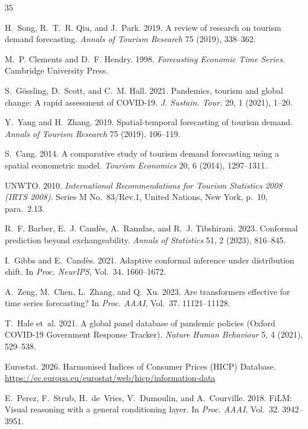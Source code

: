 \documentclass[sigconf]{acmart}
\begin{document}
\begingroup
\renewcommand{\bibfont}{\scriptsize}
\setlength{\bibsep}{0pt}
\begin{thebibliography}{35}

H.~Song, R.~T.~R. Qiu, and J.~Park. 2019. A review of research on tourism demand forecasting. \emph{Annals of Tourism Research} 75 (2019), 338--362.

M.~P. Clements and D.~F. Hendry. 1998. \emph{Forecasting Economic Time Series}. Cambridge University Press.

S.~G{\"o}ssling, D.~Scott, and C.~M. Hall. 2021. Pandemics, tourism and global change: A rapid assessment of COVID-19. \emph{J. Sustain. Tour.} 29, 1 (2021), 1--20.

Y.~Yang and H.~Zhang. 2019. Spatial-temporal forecasting of tourism demand. \emph{Annals of Tourism Research} 75 (2019), 106--119.

S.~Cang. 2014. A comparative study of tourism demand forecasting using a spatial econometric model. \emph{Tourism Economics} 20, 6 (2014), 1297--1311.

UNWTO. 2010. \emph{International Recommendations for Tourism Statistics 2008 (IRTS 2008)}. Series M No.~83/Rev.1, United Nations, New York, p.~10, para.~2.13.

R.~F. Barber, E.~J. Cand{\`e}s, A.~Ramdas, and R.~J. Tibshirani. 2023. Conformal prediction beyond exchangeability. \emph{Annals of Statistics} 51, 2 (2023), 816--845.

I.~Gibbs and E.~Cand{\`e}s. 2021. Adaptive conformal inference under distribution shift. In \emph{Proc. NeurIPS}, Vol.~34. 1660--1672.

A.~Zeng, M.~Chen, L.~Zhang, and Q.~Xu. 2023. Are transformers effective for time series forecasting? In \emph{Proc. AAAI}, Vol.~37. 11121--11128.

T.~Hale et~al. 2021. A global panel database of pandemic policies (Oxford COVID-19 Government Response Tracker). \emph{Nature Human Behaviour} 5, 4 (2021), 529--538.

Eurostat. 2026. Harmonised Indices of Consumer Prices (HICP) Database. \url{https://ec.europa.eu/eurostat/web/hicp/information-data}

E.~Perez, F.~Strub, H.~de~Vries, V.~Dumoulin, and A.~Courville. 2018. FiLM: Visual reasoning with a general conditioning layer. In \emph{Proc. AAAI}, Vol.~32. 3942--3951.


\end{thebibliography}
\end{document}

